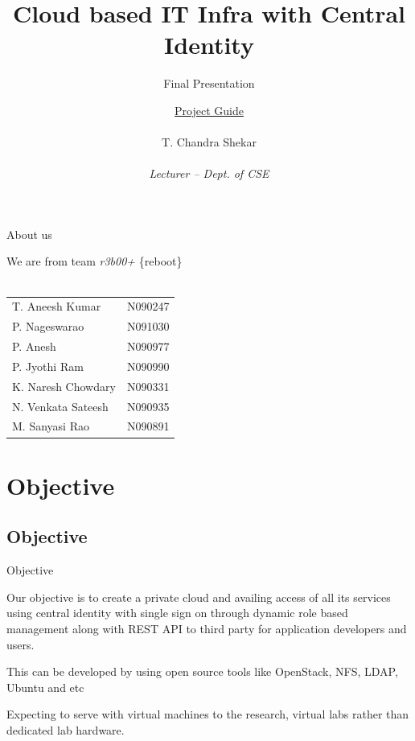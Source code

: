 \documentclass[10pt,xcolor=dvipsnames]{beamer}
\title[Cloud based IT Infra with Central Identity]{Cloud based IT Infra with Central Identity}
\subtitle{Final Presentation}
\author{ \underline{Project Guide} \\ \hspace{2mm} \\ \small{ T. Chandra Shekar } \tiny \\ \underline{} \\ \scriptsize \textit{Lecturer -- Dept. of CSE} }
\institute{ \underline{Presenting by} \\ \hspace{2mm} \\ \textit {Team r3b00+ }  \\ \hspace{4mm} \\ Dept. of CSE, RGUKT -- Nuzvid}
\begin{document}
\begin{frame}
\titlepage
\end{frame}


\begin{frame}{About us}

\small
\begin{center}
We are from team \textit{r3b00+}  \{reboot\} \\ \hspace{4cm} \\
\begin{tabular}{l  l }
T. Aneesh Kumar & N090247   \\
P. Nageswarao  & N091030  \\
P. Anesh  & N090977 \\
P. Jyothi Ram & N090990 \\
K. Naresh Chowdary  & N090331 \\
N. Venkata Sateesh  & N090935 \\
M. Sanyasi Rao & N090891  
\end{tabular}


\end{center}


\end{frame}
 

\section{Objective}
\subsection{Objective}
\begin{frame}{Objective}

Our objective is to create a  private cloud and availing access of all its services using central identity with single sign on through dynamic role based management along with REST API to third party for application developers and users. \newline

This can be developed by using open source tools like OpenStack, NFS, LDAP, Ubuntu and etc \newline

Expecting to serve with virtual machines to the research, virtual labs rather than dedicated lab hardware.
\end{frame}
\end{document}
